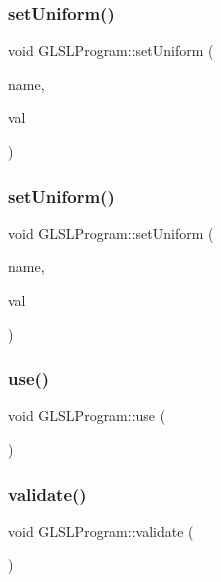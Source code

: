 \subsubsection{\texorpdfstring{setUniform()}{setUniform()}\hspace{0.1cm}{\footnotesize\ttfamily [9/10]}}
{\footnotesize\ttfamily void G\+L\+S\+L\+Program\+::set\+Uniform (\begin{DoxyParamCaption}\item[{const char $\ast$}]{name,  }\item[{bool}]{val }\end{DoxyParamCaption})}

\mbox{\label{class_g_l_s_l_program_a759987af814d389c9081874ac788717f}} 
\subsubsection{\texorpdfstring{setUniform()}{setUniform()}\hspace{0.1cm}{\footnotesize\ttfamily [10/10]}}
{\footnotesize\ttfamily void G\+L\+S\+L\+Program\+::set\+Uniform (\begin{DoxyParamCaption}\item[{const char $\ast$}]{name,  }\item[{G\+Luint}]{val }\end{DoxyParamCaption})}

\mbox{\label{class_g_l_s_l_program_a0ea2aeacb4361b37f145246430134bb6}} 
\subsubsection{\texorpdfstring{use()}{use()}}
{\footnotesize\ttfamily void G\+L\+S\+L\+Program\+::use (\begin{DoxyParamCaption}{ }\end{DoxyParamCaption})}

\mbox{\label{class_g_l_s_l_program_af15950a7ce467792fcc17430d03c5e31}} 
\subsubsection{\texorpdfstring{validate()}{validate()}}
{\footnotesize\ttfamily void G\+L\+S\+L\+Program\+::validate (\begin{DoxyParamCaption}{ }\end{DoxyParamCaption})}



